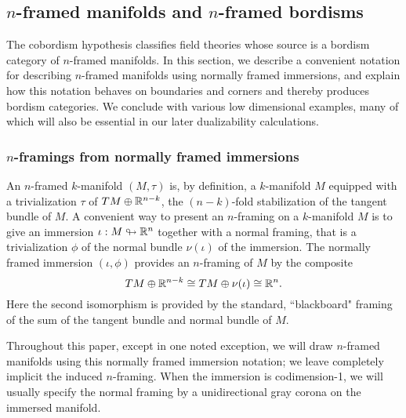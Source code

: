 \documentclass{amsart}
\begin{document}
\subsection{$n$-framed manifolds and $n$-framed bordisms} \label{sec:notation}


The cobordism hypothesis classifies field theories whose source is a bordism category of $n$-framed manifolds.  In this section, we describe a convenient notation for describing $n$-framed manifolds using normally framed immersions, and explain how this notation behaves on boundaries and corners and thereby produces bordism categories.  We conclude with various low dimensional examples, many of which will also be essential in our later dualizability calculations.

\subsubsection{$n$-framings from normally framed immersions}

An $n$-framed $k$-manifold $(M,\tau)$ is, by definition, a $k$-manifold $M$ equipped with a trivialization $\tau$ of $TM \oplus \mathbb R^{n-k}$, the $(n-k)$-fold stabilization of the tangent bundle of $M$.  A convenient way to present an $n$-framing on a $k$-manifold $M$ is to give an immersion $\iota: M \looparrowright \mathbb R^n$ together with a normal framing, that is a trivialization $\phi$ of the normal bundle $\nu(\iota)$ of the immersion.  The normally framed immersion $(\iota, \phi)$ provides an $n$-framing of $M$ by the composite
\[
TM \oplus \mathbb R^{n-k} \cong TM \oplus \nu(\iota) \cong \mathbb R^n.
\]
Here the second isomorphism is provided by the standard, ``blackboard" framing of the sum of the tangent bundle and normal bundle of $M$.

Throughout this paper, except in one noted exception, we will draw $n$-framed manifolds using this normally framed immersion notation; we leave completely implicit the induced $n$-framing.  When the immersion is codimension-1, we will usually specify the normal framing by a unidirectional gray corona on the immersed manifold.
\end{document}
